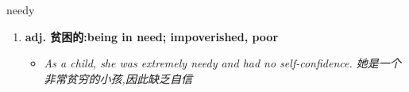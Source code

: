 
\begin{frame}
{\huge needy}
\begin{center}
\begin{enumerate}\Large
  \item \textbf{adj. 贫困的:being in need; impoverished, poor}
  \begin{itemize}
    \item \em{\Large{As a child, she was extremely needy and had no self-confidence. 她是一个非常贫穷的小孩,因此缺乏自信}}
  \end{itemize}
\end{enumerate}
\end{center}
\end{frame}
